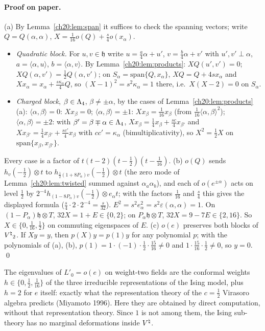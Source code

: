 \paragraph{Proof on paper.}  (a) By Lemma~\ref{ch20:lem:span} it suffices to check the spanning vectors; write
$Q=Q(\alpha,\alpha)$, $X=\tfrac1{16}o(Q)+\tfrac s4o(x_\alpha)$.
\begin{itemize}
\item \emph{Quadratic block.}  For $u,v\in\mathfrak h$ write $u=\tfrac{a}{4}\alpha+u'$, $v=\tfrac b4\alpha+v'$ with $u',v'\perp\alpha$,
  $a=\langle\alpha,u\rangle$, $b=\langle\alpha,v\rangle$.  By Lemma~\ref{ch20:lem:products}: $XQ(u',v')=0$;
  $XQ(\alpha,v')=\tfrac12Q(\alpha,v')$; on $S_\alpha=\mathrm{span}\{Q,x_\alpha\}$, $XQ=Q+4sx_\alpha$ and
  $Xx_\alpha=x_\alpha+\tfrac{s\kappa_\alpha}4Q$, so $(X-1)^2=s^2\kappa_\alpha=1$ there, i.e.\ $X(X-2)=0$ on $S_\alpha$.
\item \emph{Charged block}, $\beta\in{\Lambda}_4$, $\beta\ne\pm\alpha$, by the cases of Lemma~\ref{ch20:lem:products}(a):
  $\langle\alpha,\beta\rangle=0$: $Xx_\beta=0$; $\langle\alpha,\beta\rangle=\pm1$: $Xx_\beta=\tfrac1{16}x_\beta$ (from $\tfrac1{16}\langle\alpha,\beta\rangle^2$);
  $\langle\alpha,\beta\rangle=\pm2$: with $\beta'=\beta\mp\alpha\in{\Lambda}_4$, $Xx_\beta=\tfrac14x_\beta+\tfrac{sc}4x_{\beta'}$ and
  $Xx_{\beta'}=\tfrac14x_{\beta'}+\tfrac{sc'}4x_\beta$ with $cc'=\kappa_\alpha$ (bimultiplicativity), so $X^2=\tfrac12X$ on
  $\mathrm{span}\{x_\beta,x_{\beta'}\}$.
\end{itemize}
Every case is a factor of $t(t-2)(t-\tfrac12)(t-\tfrac1{16})$.  (b) $o(Q)$ sends $h_v(-\tfrac12)\otimes t$ to
$h_{\frac12(1+8P_\alpha)v}(-\tfrac12)\otimes t$ (the zero mode of Lemma~\ref{ch20:lem:twisted} summed against
$\alpha_a\alpha_b$), and each of $o(e^{\pm\alpha})$ acts on level $\tfrac12$ by $2^{-4}h_{(1-8P_\alpha)v}(-\tfrac12)\otimes e_\alpha t$; with
the factors $\tfrac1{16}$ and $\tfrac s4$ this gives the displayed formula ($\tfrac s4\cdot2\cdot2^{-4}=\tfrac s{32}$).  $E^2=s^2e_\alpha^2=s^2\varepsilon(\alpha,\alpha)=1$.  On
$(1-P_\alpha)\mathfrak h\otimes T$, $32X=1+E\in\{0,2\}$; on $P_\alpha\mathfrak h\otimes T$, $32X=9-7E\in\{2,16\}$.  So
$X\in\{0,\tfrac1{16},\tfrac12\}$ on commuting eigenspaces of $E$.  (c) $o(e)$ preserves both blocks of ${V^{\natural}}_2$.  If
$Xy=y$, then $p(X)y=p(1)y$ for any polynomial $p$; with the polynomials of (a), (b), $p(1)=1\cdot(-1)\cdot\tfrac12\cdot\tfrac{15}{16}\ne0$
and $1\cdot\tfrac{15}{16}\cdot\tfrac12\ne0$, so $y=0$. \qed
\begin{physics}
The eigenvalues of $L'_0=o(e)$ on weight-two fields are the conformal weights $h\in\{0,\tfrac12,\tfrac1{16}\}$ of the three
irreducible representations of the Ising model, plus $h=2$ for $e$ itself: exactly what the representation theory of
the $c=\tfrac12$ Virasoro algebra predicts (Miyamoto 1996).  Here they are obtained by direct computation, without that
representation theory.  Since $1$ is not among them, the Ising sub-theory has no marginal deformations inside ${V^{\natural}}$.
\end{physics}
